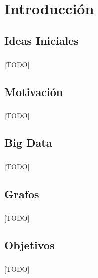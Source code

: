 \documentclass{subfiles}
\begin{document}
  \chapter{Introducción}
  \label{chap:intro}

    \section{Ideas Iniciales}
    \label{sec:introduction_initial_ideas}

      \paragraph{}
      [TODO]

    \section{Motivación}
    \label{sec:introduction_motivation}

      \paragraph{}
      [TODO]

    \section{Big Data}
    \label{sec:introduction_big_data}

      \paragraph{}
      [TODO]

    \section{Grafos}
    \label{sec:introduction_graphs}

      \paragraph{}
      [TODO]

    \section{Objetivos}
    \label{sec:introduction_goals}

      \paragraph{}
      [TODO]
\end{document}
